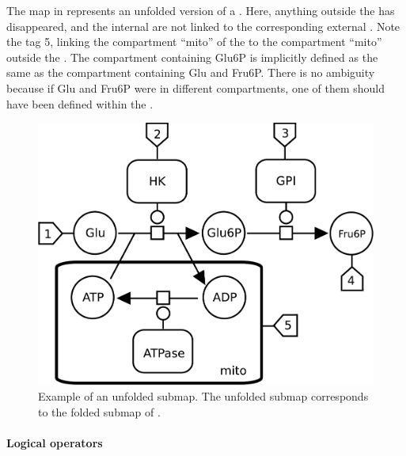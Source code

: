 The map in  represents an unfolded version of a .  Here, anything outside the  has disappeared, and the internal  are not linked to the corresponding external .  Note the tag 5, linking the compartment ``mito'' of the  to the compartment ``mito'' outside the .  The compartment containing Glu6P is implicitly defined as the same as the compartment containing Glu and Fru6P.  There is no ambiguity because if Glu and Fru6P were in different compartments, one of them should have been defined within the .

\begin{figure}[H]
  \centering
  \includegraphics[scale = 0.35]{examples/submap-dissociated}
  \caption{Example of an unfolded submap. The unfolded submap corresponds to the folded submap of .}
  \label{fig:submap-unfolded}
\end{figure}



\paragraph{Logical operators}\label{sec:logic}

